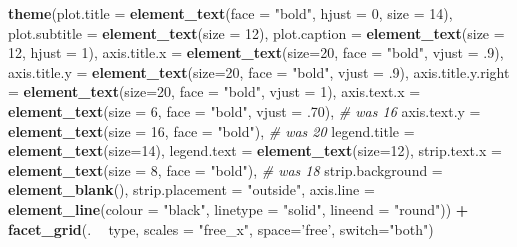 \documentclass[
]{article}
\newenvironment{Shaded}{\begin{snugshade}}{\end{snugshade}}
\newcommand{\CommentTok}[1]{\textcolor[rgb]{0.56,0.35,0.01}{\textit{#1}}}
\newcommand{\DataTypeTok}[1]{\textcolor[rgb]{0.13,0.29,0.53}{#1}}
\newcommand{\DecValTok}[1]{\textcolor[rgb]{0.00,0.00,0.81}{#1}}
\newcommand{\FloatTok}[1]{\textcolor[rgb]{0.00,0.00,0.81}{#1}}
\newcommand{\KeywordTok}[1]{\textcolor[rgb]{0.13,0.29,0.53}{\textbf{#1}}}
\newcommand{\NormalTok}[1]{#1}
\newcommand{\OperatorTok}[1]{\textcolor[rgb]{0.81,0.36,0.00}{\textbf{#1}}}
\newcommand{\StringTok}[1]{\textcolor[rgb]{0.31,0.60,0.02}{#1}}
\begin{document}
\begin{Shaded}
\begin{Highlighting}[]
\StringTok{  }\KeywordTok{theme}\NormalTok{(}\DataTypeTok{plot.title =} \KeywordTok{element_text}\NormalTok{(}\DataTypeTok{face =} \StringTok{"bold"}\NormalTok{, }\DataTypeTok{hjust =} \DecValTok{0}\NormalTok{, }\DataTypeTok{size =} \DecValTok{14}\NormalTok{), }
          \DataTypeTok{plot.subtitle =} \KeywordTok{element_text}\NormalTok{(}\DataTypeTok{size =} \DecValTok{12}\NormalTok{),}
          \DataTypeTok{plot.caption =} \KeywordTok{element_text}\NormalTok{(}\DataTypeTok{size =} \DecValTok{12}\NormalTok{, }\DataTypeTok{hjust =} \DecValTok{1}\NormalTok{),}
          \DataTypeTok{axis.title.x =} \KeywordTok{element_text}\NormalTok{(}\DataTypeTok{size=}\DecValTok{20}\NormalTok{, }\DataTypeTok{face =} \StringTok{"bold"}\NormalTok{, }\DataTypeTok{vjust =} \FloatTok{.9}\NormalTok{),}
          \DataTypeTok{axis.title.y =} \KeywordTok{element_text}\NormalTok{(}\DataTypeTok{size=}\DecValTok{20}\NormalTok{, }\DataTypeTok{face =} \StringTok{"bold"}\NormalTok{, }\DataTypeTok{vjust =} \FloatTok{.9}\NormalTok{),}
          \DataTypeTok{axis.title.y.right =} \KeywordTok{element_text}\NormalTok{(}\DataTypeTok{size=}\DecValTok{20}\NormalTok{, }\DataTypeTok{face =} \StringTok{"bold"}\NormalTok{, }\DataTypeTok{vjust =} \DecValTok{1}\NormalTok{),}
          \DataTypeTok{axis.text.x =} \KeywordTok{element_text}\NormalTok{(}\DataTypeTok{size =} \DecValTok{6}\NormalTok{, }\DataTypeTok{face =} \StringTok{"bold"}\NormalTok{, }\DataTypeTok{vjust =} \FloatTok{.70}\NormalTok{), }\CommentTok{# was 16 }
          \DataTypeTok{axis.text.y =} \KeywordTok{element_text}\NormalTok{(}\DataTypeTok{size =} \DecValTok{16}\NormalTok{, }\DataTypeTok{face =} \StringTok{"bold"}\NormalTok{), }\CommentTok{# was 20}
          \DataTypeTok{legend.title =} \KeywordTok{element_text}\NormalTok{(}\DataTypeTok{size=}\DecValTok{14}\NormalTok{), }
          \DataTypeTok{legend.text =} \KeywordTok{element_text}\NormalTok{(}\DataTypeTok{size=}\DecValTok{12}\NormalTok{),}
          \DataTypeTok{strip.text.x =} \KeywordTok{element_text}\NormalTok{(}\DataTypeTok{size =} \DecValTok{8}\NormalTok{, }\DataTypeTok{face =} \StringTok{"bold"}\NormalTok{), }\CommentTok{# was 18}
          \DataTypeTok{strip.background =} \KeywordTok{element_blank}\NormalTok{(),}
          \DataTypeTok{strip.placement =} \StringTok{"outside"}\NormalTok{,}
          \DataTypeTok{axis.line =} \KeywordTok{element_line}\NormalTok{(}\DataTypeTok{colour =} \StringTok{"black"}\NormalTok{, }\DataTypeTok{linetype =} \StringTok{"solid"}\NormalTok{, }\DataTypeTok{lineend =} \StringTok{"round"}\NormalTok{)) }\OperatorTok{+}
\StringTok{  }\KeywordTok{facet_grid}\NormalTok{(. }\OperatorTok{~}\StringTok{ }\NormalTok{type, }
             \DataTypeTok{scales =} \StringTok{"free_x"}\NormalTok{, }\DataTypeTok{space=}\StringTok{'free'}\NormalTok{, }\DataTypeTok{switch=}\StringTok{"both"}\NormalTok{)}
\end{Highlighting}
\end{Shaded}
\end{document}
